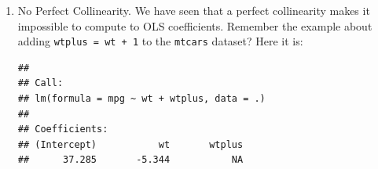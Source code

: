 \documentclass[]{book}
\newenvironment{Shaded}{\begin{snugshade}}{\end{snugshade}}
\newcommand{\KeywordTok}[1]{\textcolor[rgb]{0.13,0.29,0.53}{\textbf{#1}}}
\newcommand{\DataTypeTok}[1]{\textcolor[rgb]{0.13,0.29,0.53}{#1}}
\newcommand{\DecValTok}[1]{\textcolor[rgb]{0.00,0.00,0.81}{#1}}
\newcommand{\StringTok}[1]{\textcolor[rgb]{0.31,0.60,0.02}{#1}}
\newcommand{\OperatorTok}[1]{\textcolor[rgb]{0.81,0.36,0.00}{\textbf{#1}}}
\newcommand{\NormalTok}[1]{#1}
\begin{document}
\begin{enumerate}
\def\labelenumi{\arabic{enumi}.}
\item
  No Perfect Collinearity. We have seen that a perfect collinearity
  makes it impossible to compute to OLS coefficients. Remember the
  example about adding \texttt{wtplus\ =\ wt\ +\ 1} to the
  \texttt{mtcars} dataset? Here it is:

\begin{Shaded}
\end{Shaded}

\begin{verbatim}
## 
## Call:
## lm(formula = mpg ~ wt + wtplus, data = .)
## 
## Coefficients:
## (Intercept)           wt       wtplus  
##      37.285       -5.344           NA
\end{verbatim}


\end{enumerate}
\end{document}

